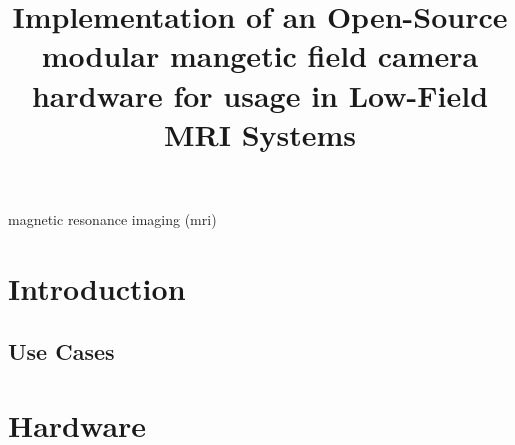 \documentclass[conference]{IEEEtran}
\begin{document}
\title{Implementation of an Open-Source modular mangetic field camera hardware for usage in Low-Field MRI Systems}


\author{
}

\maketitle

\begin{abstract}

\end{abstract}

\begin{IEEEkeywords}
magnetic resonance imaging (\gls{mri})
\end{IEEEkeywords}



\section{Introduction}


\subsection{Use Cases}





\section{Hardware}

\end{document}
